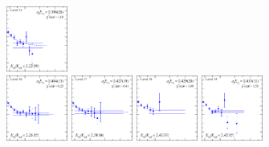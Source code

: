 \begin{figure}[H]
    \includegraphics[width=0.18\textwidth]{figures/sigmas/g2u/fits/fit_17.pdf}\\
    \includegraphics[width=0.18\textwidth]{figures/sigmas/g2u/fits/fit_12.pdf}
    \includegraphics[width=0.18\textwidth]{figures/sigmas/g2u/fits/fit_13.pdf}
    \includegraphics[width=0.18\textwidth]{figures/sigmas/g2u/fits/fit_15.pdf}
    \includegraphics[width=0.18\textwidth]{figures/sigmas/g2u/fits/fit_16.pdf}\\

\end{figure}
